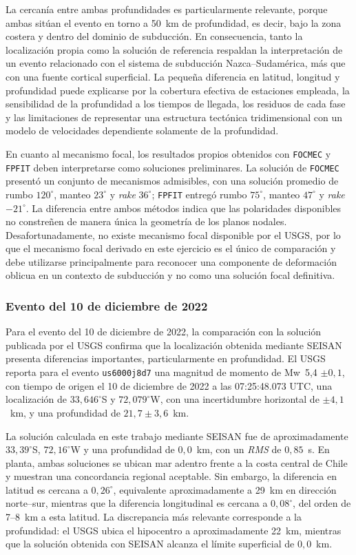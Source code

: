 \documentclass[a4paper,12pt]{article} %
\numberwithin{equation}{section} %
\numberwithin{figure}{section} %
\begin{document}
La cercanía entre ambas profundidades es particularmente relevante, porque ambas sitúan el evento en torno a 50~km de profundidad, es decir, bajo la zona costera y dentro del dominio de subducción. En consecuencia, tanto la localización propia como la solución de referencia respaldan la interpretación de un evento relacionado con el sistema de subducción Nazca--Sudamérica, más que con una fuente cortical superficial. La pequeña diferencia en latitud, longitud y profundidad puede explicarse por la cobertura efectiva de estaciones empleada, la sensibilidad de la profundidad a los tiempos de llegada, los residuos de cada fase y las limitaciones de representar una estructura tectónica tridimensional con un modelo de velocidades dependiente solamente de la profundidad.

En cuanto al mecanismo focal, los resultados propios obtenidos con \texttt{FOCMEC} y \texttt{FPFIT} deben interpretarse como soluciones preliminares. La solución de \texttt{FOCMEC} presentó un conjunto de mecanismos admisibles, con una solución promedio de rumbo $120^\circ$, manteo $23^\circ$ y \textit{rake} $36^\circ$; \texttt{FPFIT} entregó rumbo $75^\circ$, manteo $47^\circ$ y \textit{rake} $-21^\circ$. La diferencia entre ambos métodos indica que las polaridades disponibles no constreñen de manera única la geometría de los planos nodales. Desafortunadamente, no existe mecanismo focal disponible por el USGS, por lo que el mecanismo focal derivado en este ejercicio es el único de comparación y debe utilizarse principalmente para reconocer una componente de deformación oblicua en un contexto de subducción y no como una solución focal definitiva.

\subsubsection{Evento del 10 de diciembre de 2022}

Para el evento del 10 de diciembre de 2022, la comparación con la solución publicada por el USGS confirma que la localización obtenida mediante SEISAN presenta diferencias importantes, particularmente en profundidad. El USGS reporta para el evento \texttt{us6000j8d7} una magnitud de momento de Mw~5{,}4 $\pm 0{,}1$, con tiempo de origen el 10 de diciembre de 2022 a las 07:25:48.073 UTC, una localización de $33{,}646^\circ$S y $72{,}079^\circ$W, con una incertidumbre horizontal de $\pm 4{,}1$~km, y una profundidad de $21{,}7 \pm 3{,}6$~km.\cite{USGS2022OffshoreChile}

La solución calculada en este trabajo mediante SEISAN fue de aproximadamente $33{,}39^\circ$S, $72{,}16^\circ$W y una profundidad de $0{,}0$~km, con un \textit{RMS} de $0{,}85$~s. En planta, ambas soluciones se ubican mar adentro frente a la costa central de Chile y muestran una concordancia regional aceptable. Sin embargo, la diferencia en latitud es cercana a $0{,}26^\circ$, equivalente aproximadamente a 29~km en dirección norte--sur, mientras que la diferencia longitudinal es cercana a $0{,}08^\circ$, del orden de 7--8~km a esta latitud. La discrepancia más relevante corresponde a la profundidad: el USGS ubica el hipocentro a aproximadamente 22~km, mientras que la solución obtenida con SEISAN alcanza el límite superficial de $0{,}0$~km.
\end{document}
